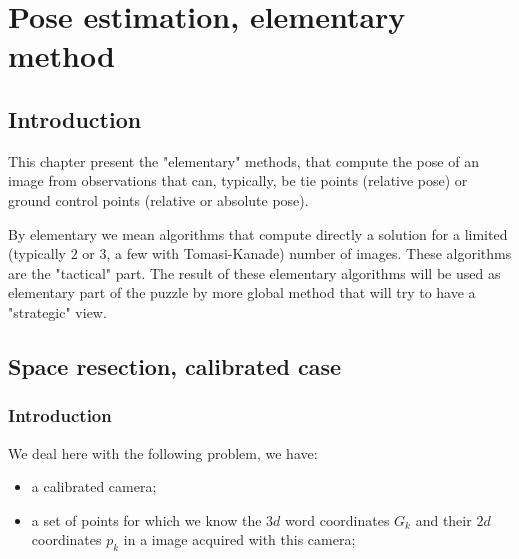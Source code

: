 \chapter{Pose estimation, elementary method}


\section{Introduction}

This chapter present the "elementary" methods, that compute the pose of an image
from observations that can, typically, be tie points (relative pose) or 
ground control points (relative or absolute pose).

By elementary we mean algorithms that compute directly a solution for a limited
(typically $2$ or $3$, a few with Tomasi-Kanade) number of images. These algorithms
are the "tactical" part. The result of these elementary algorithms will be used as
elementary part of the puzzle by more global method that will try to have a "strategic" view.



\section{Space resection, calibrated case}

\label{SR_Cal}

\subsection{Introduction}

We deal here with the following problem, we have:

\begin{itemize}
   \item a calibrated camera;
   \item a set of points for which we know the  $3d$ word coordinates $G_k$ and their 
        $2d$ coordinates $p_k$ in a image acquired with this camera;
\end{itemize}

